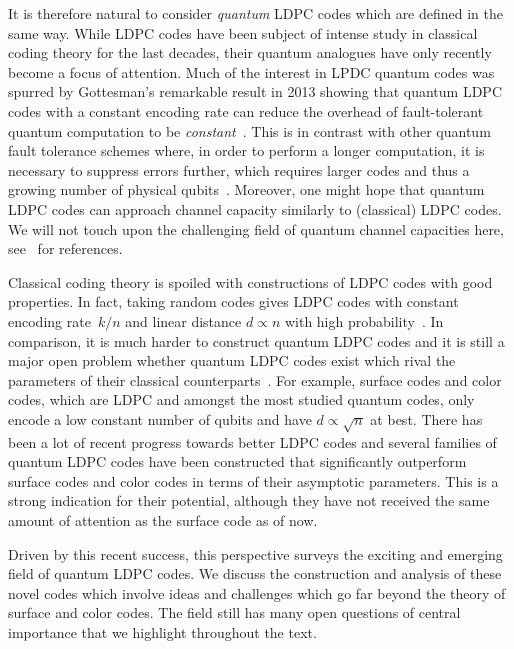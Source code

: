 \documentclass[amsmath, amssymb, floatfix, reprint, twocolumn, notitlepage, 10pt]{revtex4-1}
\newcommand{\change}{}
\begin{document}
It is therefore natural to consider \emph{quantum} LDPC codes which are defined in the same way.
While LDPC codes have been subject of intense study in classical coding theory for the last decades, their quantum analogues have only recently become a focus of attention.
Much of the interest in LPDC quantum codes was spurred by Gottesman's remarkable result in 2013 showing that quantum LDPC codes with a constant encoding rate can reduce the overhead of fault-tolerant quantum computation to be \emph{constant}~\cite{gottesman2014overhead}.
This is in contrast with other quantum fault tolerance schemes where, in order to perform a longer computation, it is necessary to suppress errors further, which requires larger codes and thus a growing number of physical qubits~\cite{kitaev1997quantum,knill1998resilient,aharonov2008fault}. 
{\change Moreover, one might hope that quantum LDPC codes can approach channel capacity similarly to (classical) LDPC codes.
We will not touch upon the challenging field of quantum channel capacities here, see~\cite{wilde2013quantum,gyongyosi2018survey,delfosse2012upper} for references.}

Classical coding theory is spoiled with constructions of LDPC codes with good properties.
In fact, taking random codes gives LDPC codes with constant encoding rate~$k/n$ and linear distance $d \propto n$ with high probability~\cite{gallager1962low,richardson2008modern}.
In comparison, it is much harder to construct quantum LDPC codes and it is still a major open problem whether quantum LDPC codes exist which rival the parameters of their classical counterparts~\cite{mackay2004sparse}.
{\change
For example, surface codes and color codes, which are LDPC and amongst the most studied quantum codes, only encode a low constant number of qubits and have $d\propto \sqrt{n}$ at best.
There has been a lot of recent progress towards better LDPC codes and several families of quantum LDPC codes have been constructed that significantly outperform surface codes and color codes in terms of their asymptotic parameters.
This is a strong indication for their potential, although they have not received the same amount of attention as the surface code as of now.
}

{\change 
Driven by this recent success, this perspective surveys the exciting and emerging field of quantum LDPC codes.
We discuss the construction and analysis of these novel codes which involve ideas and challenges which go far beyond the theory of surface and color codes. The field still has many open questions of central importance that we highlight throughout the text.
}
\end{document}

